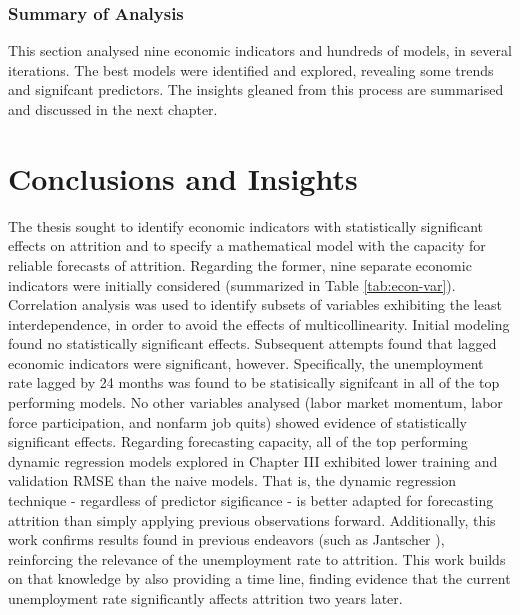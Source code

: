 \documentclass[12pt,letterpaper,toc=flat,oneside]{report}
\theoremstyle{definition}
\theoremstyle{definition}
\theoremstyle{definition}
\theoremstyle{remark}
\begin{document}
\hypertarget{summary-of-analysis}{%
\subsection{Summary of Analysis}\label{summary-of-analysis}}

This section analysed nine economic indicators and hundreds of models,
in several iterations. The best models were identified and explored,
revealing some trends and signifcant predictors. The insights gleaned
from this process are summarised and discussed in the next chapter.

\newpage

\hypertarget{conclusions-and-insights}{%
\chapter{Conclusions and Insights}\label{conclusions-and-insights}}

The thesis sought to identify economic indicators with statistically
significant effects on attrition and to specify a mathematical model
with the capacity for reliable forecasts of attrition. Regarding the
former, nine separate economic indicators were initially considered
(summarized in Table \ref{tab:econ-var}). Correlation analysis was used
to identify subsets of variables exhibiting the least interdependence,
in order to avoid the effects of multicollinearity. Initial modeling
found no statistically significant effects. Subsequent attempts found
that lagged economic indicators were significant, however. Specifically,
the unemployment rate lagged by 24 months was found to be statisically
signifcant in all of the top performing models. No other variables
analysed (labor market momentum, labor force participation, and nonfarm
job quits) showed evidence of statistically significant effects.
Regarding forecasting capacity, all of the top performing dynamic
regression models explored in Chapter III exhibited lower training and
validation RMSE than the naive models. That is, the dynamic regression
technique - regardless of predictor sigificance - is better adapted for
forecasting attrition than simply applying previous observations
forward. Additionally, this work confirms results found in previous
endeavors (such as Jantscher \cite{jantscher-2016}), reinforcing the
relevance of the unemployment rate to attrition. This work builds on
that knowledge by also providing a time line, finding evidence that the
current unemployment rate significantly affects attrition two years
later.
\end{document}
